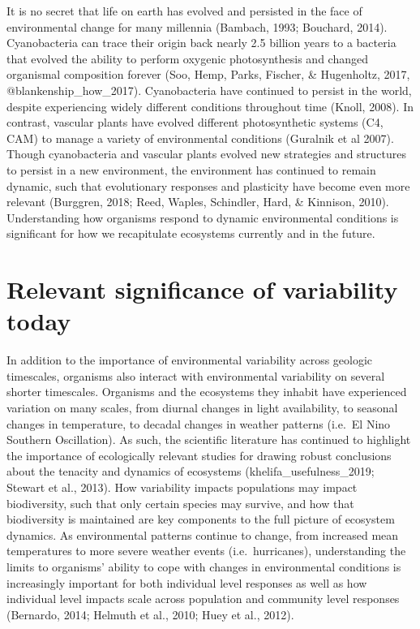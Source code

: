 \documentclass[12pt,twoside]{reedthesis}
\begin{document}
It is no secret that life on earth has evolved and persisted in the face of environmental change for many millennia (Bambach, 1993; Bouchard, 2014). Cyanobacteria can trace their origin back nearly 2.5 billion years to a bacteria that evolved the ability to perform oxygenic photosynthesis and changed organismal composition forever (Soo, Hemp, Parks, Fischer, \& Hugenholtz, 2017, @blankenship\_how\_2017). Cyanobacteria have continued to persist in the world, despite experiencing widely different conditions throughout time (Knoll, 2008). In contrast, vascular plants have evolved different photosynthetic systems (C4, CAM) to manage a variety of environmental conditions (Guralnik et al 2007). Though cyanobacteria and vascular plants evolved new strategies and structures to persist in a new environment, the environment has continued to remain dynamic, such that evolutionary responses and plasticity have become even more relevant (Burggren, 2018; Reed, Waples, Schindler, Hard, \& Kinnison, 2010). Understanding how organisms respond to dynamic environmental conditions is significant for how we recapitulate ecosystems currently and in the future.

\hypertarget{relevant-significance-of-variability-today}{%
\section{Relevant significance of variability today}\label{relevant-significance-of-variability-today}}

In addition to the importance of environmental variability across geologic timescales, organisms also interact with environmental variability on several shorter timescales. Organisms and the ecosystems they inhabit have experienced variation on many scales, from diurnal changes in light availability, to seasonal changes in temperature, to decadal changes in weather patterns (i.e.~El Nino Southern Oscillation). As such, the scientific literature has continued to highlight the importance of ecologically relevant studies for drawing robust conclusions about the tenacity and dynamics of ecosystems (khelifa\_usefulness\_2019; Stewart et al., 2013). How variability impacts populations may impact biodiversity, such that only certain species may survive, and how that biodiversity is maintained are key components to the full picture of ecosystem dynamics. As environmental patterns continue to change, from increased mean temperatures to more severe weather events (i.e.~hurricanes), understanding the limits to organisms' ability to cope with changes in environmental conditions is increasingly important for both individual level responses as well as how individual level impacts scale across population and community level responses (Bernardo, 2014; Helmuth et al., 2010; Huey et al., 2012).
\end{document}
